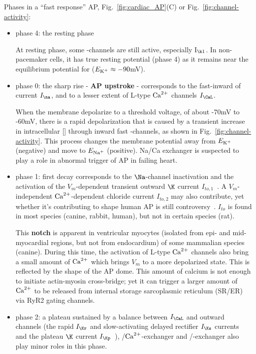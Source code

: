 Phases in a ``fast response'' AP, Fig.~\ref{fig:cardiac_AP}(C) or
Fig.~\ref{fig:channel-activity}:
\begin{itemize}
\item phase 4: the resting phase

  At resting phase, some -channels are still active, especially
  I$_{\k1}$. In non-pacemaker cells, it has true resting potential (phase 4)
  as it remains near the equilibrium potential for  ($E_{\ce{K+}} \approx
  -90$mV). 

\item phase 0: the sharp rise - {\bf AP upstroke} - corresponds to the
  fast-inward of   current $I_\na$, and to a lesser extent of
  L-type ${\text{Ca}^{2+}}$ channels $I_\CaL$. 

  When the membrane depolarize to a threshold voltage, of about -70mV to -60mV,
  there is a rapid depolarization that is caused by a transient
  increase in intracellular [] through inward fast
  -channels, as shown in Fig.~\ref{fig:channel-activity}.
  This process changes the membrane potential away from $E_{\ce{K+}}$
  (negative) and move to $E_{\ce{Na+}}$ (positive). Na/Ca exchanger is suspected
  to play a role in abnormal trigger of AP in failing heart.

\item phase 1: first decay corresponds to the $\Na$-channel
  inactivation and the activation of the $V_m$-dependent transient
  outward $\K$ current $I_{to,1}$~\citep{sah2003}. A $V_m$-independent
  ${\text{Ca}^{2+}}$-dependent chloride current $I_{to,2}$ may also contribute, yet
  whether it's contributing to shape human AP is still
  controversy~\citep{ORourke1996}. $I_{to}$ is found in most species (canine,
  rabbit, human), but not in certain species (rat). 

  This {\bf notch} is apparent in ventricular myocytes (isolated from epi- and
  mid- myocardial regions, but not from endocardium) of some mammalian species
  (canine). During this time, the activation of L-type ${\text{Ca}^{2+}}$ channels also bring
  a small amount of ${\text{Ca}^{2+}}$ which brings $V_m$ to a more depolarized state. This
  is reflected by the shape of the AP dome. This amount of calcium is not enough
  to initiate actin-myosin cross-bridge; yet it can trigger a larger amount of
  ${\text{Ca}^{2+}}$ to be released from internal storage sarcoplasmic reticulum (SR/ER) via
  RyR2 gating channels.

\item phase 2: a plateau sustained by a balance between $I_\CaL$ and
  outward  channels (the rapid $I_\Kr$ and slow-activating
  delayed rectifier $I_\Ks$
  currents~\citep{horie1990,sanguinetti1990tcc} and the plateau $\K$
  current $I_\Kp$~\citep{yue1988ncp}), /${\text{Ca}^{2+}}$-exchanger
  and /-exchanger also play minor roles in this phase.


\end{itemize}
